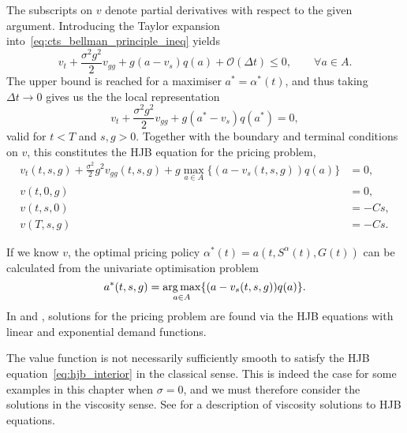 \documentclass[main.tex]{subfiles}
\begin{document}
The subscripts on $v$ denote partial derivatives with respect to the
given argument.
Introducing the Taylor expansion into~\eqref{eq:cts_bellman_principle_ineq}
yields
\begin{equation}
  v_t
  +{\textstyle\frac{\sigma^2g^2}{2}}
  v_{gg}+
  g(a-v_s)q(a)
  +\mathcal{O}(\Delta{t})\leq 0,\qquad \forall a\in A.
\end{equation}
The upper bound is reached for a maximiser $a^*=\alpha^*(t)$, and thus
taking $\Delta{t}\to 0$ gives us the the local representation
\begin{equation}
  v_t+\frac{\sigma^2g^2}{2}v_{gg}
  + g(a^*-v_s)q(a^*) = 0,
\end{equation}
valid for $t<T$ and $s,g>0$.
Together with the boundary and terminal conditions on
$v$, this constitutes the HJB equation for the pricing problem,
\begin{align}\label{eq:hjb_interior}
  v_t(t,s,g)+\frac{\sigma^2}{2} g^2v_{gg}(t,s,g)
  +g\max_{a\in A}\{(a-v_s(t,s,g))q(a)\} &= 0,\\ %
  v(t,0,g) &= 0,\\
  v(t,s,0) &= -Cs,\\
  v(T,s,g) &= -Cs.
\end{align}

If we know $v$, the optimal pricing policy
$\alpha^*(t)=a(t,S^{\alpha}(t),G(t))$
can be calculated from the univariate optimisation problem
\begin{equation}\label{eq:pricing_function_general}
  a^*(t,s,g) = \operatorname*{arg\,max}_{a\in A}\{(a-v_s(t,s,g))q(a)\}.
\end{equation}
In  and , solutions for the
pricing problem are found via the HJB equations with linear and
exponential demand functions.
\begin{remark}\label{rem:viscosity}
  The value function is not necessarily sufficiently smooth to satisfy
  the HJB equation~\eqref{eq:hjb_interior} in the classical sense.
  This is indeed the case for some examples in this chapter when $\sigma=0$,
  and we must therefore consider
  the solutions in the viscosity sense. See \citet{pham2009continuous}
  for a description of viscosity solutions to HJB equations.
\end{remark}
\end{document}
